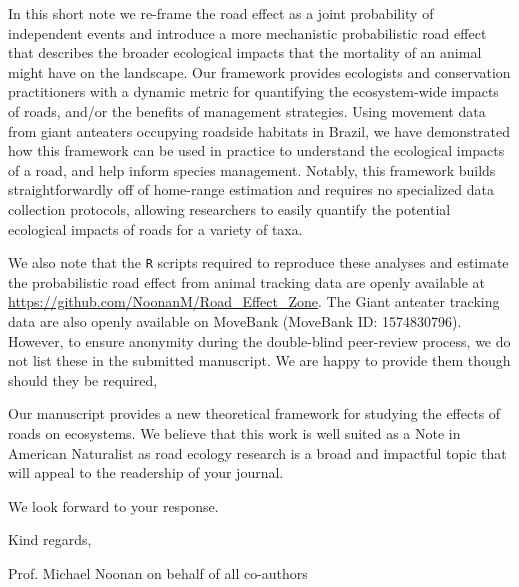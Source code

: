 \documentclass{article}
\begin{document}
In this short note we re-frame the road effect as a joint probability of independent events and introduce a more mechanistic probabilistic road effect that describes the broader ecological impacts that the mortality of an animal might have on the landscape. Our framework provides ecologists and conservation practitioners with a dynamic metric for quantifying the ecosystem-wide impacts of roads, and/or the benefits of management strategies. Using movement data from giant anteaters occupying roadside habitats in Brazil, we have demonstrated how this framework can be used in practice to understand the ecological impacts of a road, and help inform species management. Notably, this framework builds straightforwardly off of home-range estimation and requires no specialized data collection protocols, allowing researchers to easily quantify the potential ecological impacts of roads for a variety of taxa. 

We also note that the \texttt{R} scripts required to reproduce these analyses and estimate the probabilistic road effect from animal tracking data are openly available at \url{https://github.com/NoonanM/Road_Effect_Zone}. The Giant anteater tracking data are also openly available on MoveBank (MoveBank ID: 1574830796). However, to ensure anonymity during the double-blind peer-review process, we do not list these in the submitted manuscript. We are happy to provide them though should they be required, 

Our manuscript provides a new theoretical framework for studying the effects of roads on ecosystems. We believe that this work is well suited as a Note in American Naturalist as road ecology research is a broad and impactful topic that will appeal to the readership of your journal.


We look forward to your response.

Kind regards,

Prof. Michael Noonan on behalf of all co-authors
\end{document}
